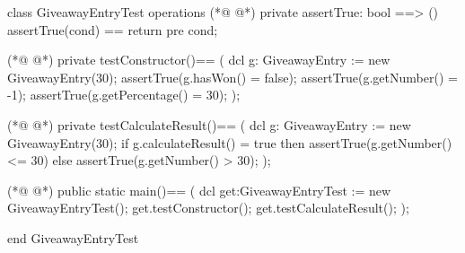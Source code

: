 \begin{vdmpp}[breaklines=true]
class GiveawayEntryTest
 operations
(*@
\label{assertTrue:3}
@*)
  private assertTrue: bool ==> ()
    assertTrue(cond) == return
    pre cond;
    
(*@
\label{testConstructor:7}
@*)
  private testConstructor()==
  (
   dcl g: GiveawayEntry := new GiveawayEntry(30);
   assertTrue(g.hasWon() = false);
   assertTrue(g.getNumber() = -1);
   assertTrue(g.getPercentage() = 30);
  );

(*@
\label{testCalculateResult:15}
@*)
  private testCalculateResult()==
  (
   dcl g: GiveawayEntry := new GiveawayEntry(30);
   if g.calculateResult() = true
    then assertTrue(g.getNumber() <= 30)
    else assertTrue(g.getNumber() > 30);
  );
  
(*@
\label{main:23}
@*)
  public static main()==
    (
   dcl get:GiveawayEntryTest := new GiveawayEntryTest();
   get.testConstructor();
   get.testCalculateResult();
    );
     
end GiveawayEntryTest
\end{vdmpp}
